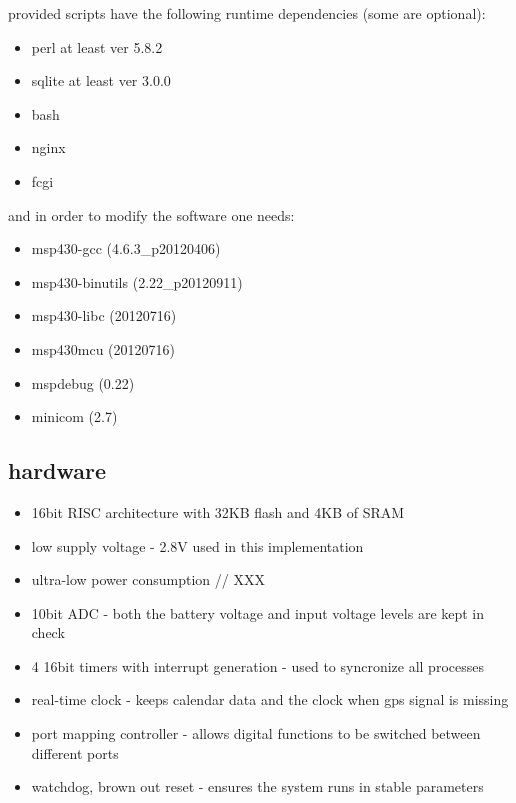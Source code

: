 \documentclass[a4paper,twoside]{refart}
\begin{document}
provided scripts have the following runtime dependencies (some are optional):

\begin{itemize}
    \item perl at least ver 5.8.2
    \item sqlite at least ver 3.0.0
    \item bash
    \item nginx
    \item fcgi
\end{itemize}

and in order to modify the software one needs:

\begin{itemize}
    \item msp430-gcc (4.6.3\_p20120406)
    \item msp430-binutils (2.22\_p20120911)
    \item msp430-libc (20120716)
    \item msp430mcu (20120716)
    \item mspdebug (0.22)
    \item minicom (2.7)
\end{itemize}


\subsection{hardware}

    \begin{itemize}
        \item 16bit RISC architecture with 32KB flash and 4KB of SRAM
        \item low supply voltage - 2.8V used in this implementation
        \item ultra-low power consumption // XXX
        \item 10bit ADC - both the battery voltage and input voltage levels are kept in check
        \item 4 16bit timers with interrupt generation - used to syncronize all processes
        \item real-time clock - keeps calendar data and the clock when gps signal is missing
        \item port mapping controller - allows digital functions to be switched between different ports
        \item watchdog, brown out reset - ensures the system runs in stable parameters
    \end{itemize}
\end{document}
